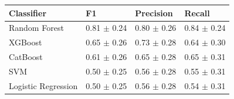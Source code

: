 \begin{tabular}{llll}
\toprule
Classifier & F1 & Precision & Recall \\
\midrule
Random Forest & 0.81 $\pm$ 0.24 & 0.80 $\pm$ 0.26 & 0.84 $\pm$ 0.24 \\
XGBoost & 0.65 $\pm$ 0.26 & 0.73 $\pm$ 0.28 & 0.64 $\pm$ 0.30 \\
CatBoost & 0.61 $\pm$ 0.26 & 0.65 $\pm$ 0.28 & 0.65 $\pm$ 0.31 \\
SVM & 0.50 $\pm$ 0.25 & 0.56 $\pm$ 0.28 & 0.55 $\pm$ 0.31 \\
Logistic Regression & 0.50 $\pm$ 0.25 & 0.56 $\pm$ 0.28 & 0.54 $\pm$ 0.31 \\
\bottomrule
\end{tabular}
